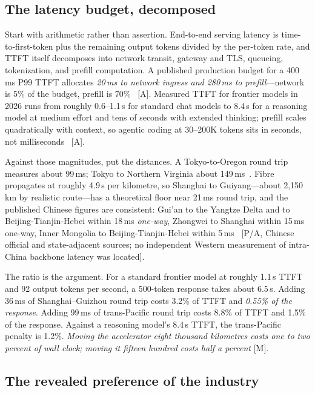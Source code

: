 \subsection{The latency budget, decomposed}

Start with arithmetic rather than assertion. End-to-end serving latency is time-to-first-token plus the remaining output tokens divided by the per-token rate, and TTFT itself decomposes into network transit, gateway and TLS, queueing, tokenization, and prefill computation. A published production budget for a 400\,ms P99 TTFT allocates \emph{20\,ms to network ingress and 280\,ms to prefill}---network is 5\% of the budget, prefill is 70\%~\cite{ttft-budget} [A]. Measured TTFT for frontier models in 2026 runs from roughly 0.6--1.1\,s for standard chat models to 8.4\,s for a reasoning model at medium effort and tens of seconds with extended thinking; prefill scales quadratically with context, so agentic coding at 30--200K tokens sits in seconds, not milliseconds~\cite{ttft-measured} [A].

Against those magnitudes, put the distances. A Tokyo-to-Oregon round trip measures about 99\,ms; Tokyo to Northern Virginia about 149\,ms~\cite{rtt-matrix}. Fibre propagates at roughly 4.9\,\textmu s per kilometre, so Shanghai to Guiyang---about 2,150\,km by realistic route---has a theoretical floor near 21\,ms round trip, and the published Chinese figures are consistent: Gui'an to the Yangtze Delta and to Beijing-Tianjin-Hebei within 18\,ms \emph{one-way}, Zhongwei to Shanghai within 15\,ms one-way, Inner Mongolia to Beijing-Tianjin-Hebei within 5\,ms~\cite{china-latency-measured} [P/A, Chinese official and state-adjacent sources; no independent Western measurement of intra-China backbone latency was located].

The ratio is the argument. For a standard frontier model at roughly 1.1\,s TTFT and 92 output tokens per second, a 500-token response takes about 6.5\,s. Adding 36\,ms of Shanghai--Guizhou round trip costs 3.2\% of TTFT and \emph{0.55\% of the response}. Adding 99\,ms of trans-Pacific round trip costs 8.8\% of TTFT and 1.5\% of the response. Against a reasoning model's 8.4\,s TTFT, the trans-Pacific penalty is 1.2\%. \emph{Moving the accelerator eight thousand kilometres costs one to two percent of wall clock; moving it fifteen hundred costs half a percent} [M].

\subsection{The revealed preference of the industry}

